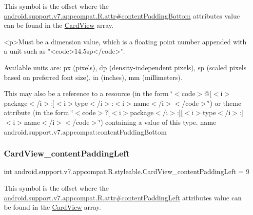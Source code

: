 This symbol is the offset where the \hyperlink{classandroid_1_1support_1_1v7_1_1appcompat_1_1R_1_1attr_a6c80b197ceddf31edc9ed8d675a89ea4}{android.\+support.\+v7.\+appcompat.\+R.\+attr\#content\+Padding\+Bottom} attribute\textquotesingle{}s value can be found in the \hyperlink{classandroid_1_1support_1_1v7_1_1appcompat_1_1R_1_1styleable_aee2dd81febffbeeaeff51a35af0f87ec}{Card\+View} array.

\begin{DoxyVerb}      <p>Must be a dimension value, which is a floating point number appended with a unit such as "<code>14.5sp</code>".
\end{DoxyVerb}
 Available units are\+: px (pixels), dp (density-\/independent pixels), sp (scaled pixels based on preferred font size), in (inches), mm (millimeters). 

This may also be a reference to a resource (in the form \char`\"{}$<$code$>$@\mbox{[}$<$i$>$package$<$/i$>$\+:\mbox{]}$<$i$>$type$<$/i$>$\+:$<$i$>$name$<$/i$>$$<$/code$>$\char`\"{}) or theme attribute (in the form \char`\"{}$<$code$>$?\mbox{[}$<$i$>$package$<$/i$>$\+:\mbox{]}\mbox{[}$<$i$>$type$<$/i$>$\+:\mbox{]}$<$i$>$name$<$/i$>$$<$/code$>$\char`\"{}) containing a value of this type.  name android.\+support.\+v7.\+appcompat\+:content\+Padding\+Bottom \mbox{\label{classandroid_1_1support_1_1v7_1_1appcompat_1_1R_1_1styleable_addee01cbb7403da18fb72955d0892654}} 
\subsubsection{\texorpdfstring{Card\+View\+\_\+content\+Padding\+Left}{CardView\_contentPaddingLeft}}
{\footnotesize\ttfamily int android.\+support.\+v7.\+appcompat.\+R.\+styleable.\+Card\+View\+\_\+content\+Padding\+Left = 9\hspace{0.3cm}{\ttfamily [static]}}

This symbol is the offset where the \hyperlink{classandroid_1_1support_1_1v7_1_1appcompat_1_1R_1_1attr_a25b1ff2e90eb5c1effb27911fb561ae7}{android.\+support.\+v7.\+appcompat.\+R.\+attr\#content\+Padding\+Left} attribute\textquotesingle{}s value can be found in the \hyperlink{classandroid_1_1support_1_1v7_1_1appcompat_1_1R_1_1styleable_aee2dd81febffbeeaeff51a35af0f87ec}{Card\+View} array.

